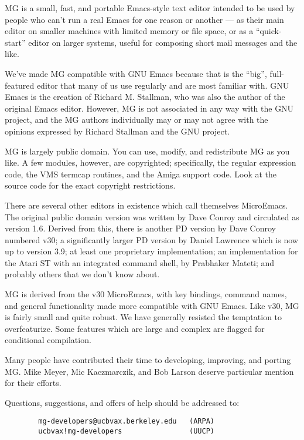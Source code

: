 MG is a small, fast, and portable Emacs-style text editor intended to
be used by people who can't run a real Emacs for one reason or another
--- as their main editor on smaller machines with limited memory or
file space, or as a ``quick-start'' editor on larger systems, useful
for composing short mail messages and the like. 

We've made MG compatible with GNU Emacs because that is the ``big'',
full-featured editor that many of us use regularly and are most
familiar with.  GNU Emacs is the creation of Richard M. Stallman, who
was also the author of the original Emacs editor.  However, MG is not
associated in any way with the GNU project, and the MG authors
individually may or may not agree with the opinions expressed by
Richard Stallman and the GNU project. 

MG is largely public domain.  You can use, modify, and redistribute MG
as you like.  A few modules, however, are copyrighted; specifically,
the regular expression code, the VMS termcap routines, and the Amiga
support code.  Look at the source code for the exact copyright
restrictions. 

There are several other editors in existence which call themselves
MicroEmacs.  The original public domain version was written by Dave
Conroy and circulated as version 1.6.  Derived from this, there is
another PD version by Dave Conroy numbered v30; a significantly larger
PD version by Daniel Lawrence which is now up to version 3.9; at least
one proprietary implementation; an implementation for the Atari ST
with an integrated command shell, by Prabhaker Mateti; and probably
others that we don't know about.

MG is derived from the v30 MicroEmacs, with key bindings, command
names, and general functionality made more compatible with GNU Emacs.
Like v30, MG is fairly small and quite robust.  We have generally
resisted the temptation to overfeaturize.  Some features which are
large and complex are flagged for conditional compilation.

Many people have contributed their time to developing, improving, and
porting MG.  Mike Meyer, Mic Kaczmarczik, and Bob Larson deserve 
particular mention for their efforts.  

Questions, suggestions, and offers of help should be addressed to:

\begin{verbatim}
        mg-developers@ucbvax.berkeley.edu   (ARPA)
        ucbvax!mg-developers                (UUCP)
\end{verbatim}

